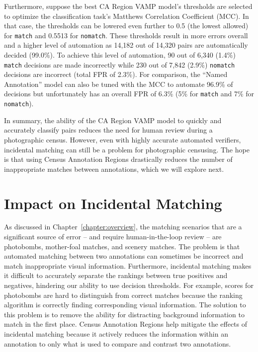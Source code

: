 Furthermore, suppose the best CA Region VAMP model's thresholds are selected to optimize the classification task's Matthews Correlation Coefficient (MCC). In that case, the thresholds can be lowered even further to 0.5 (the lowest allowed) for \texttt{match} and 0.5513 for \texttt{nomatch}.  These thresholds result in more errors overall and a higher level of automation as 14,182 out of 14,320 pairs are automatically decided (99.0\%).  To achieve this level of automation, 90 out of 6,340 (1.4\%) \texttt{match} decisions are made incorrectly while 230 out of 7,842 (2.9\%) \texttt{nomatch} decisions are incorrect (total FPR of 2.3\%).  For comparison, the ``Named Annotation'' model can also be tuned with the MCC to automate 96.9\% of decisions but unfortunately has an overall FPR of 6.3\% (5\% for \texttt{match} and 7\% for \texttt{nomatch}).

In summary, the ability of the CA Region VAMP model to quickly and accurately classify pairs reduces the need for human review during a photographic census.  However, even with highly accurate automated verifiers, incidental matching can still be a problem for photographic censusing.  The hope is that using Census Annotation Regions drastically reduces the number of inappropriate matches between annotations, which we will explore next.

\section{Impact on Incidental Matching}

As discussed in Chapter~\ref{chapter:overview}, the matching scenarios that are a significant source of error -- and require human-in-the-loop review -- are photobombs, mother-foal matches, and scenery matches.  The problem is that automated matching between two annotations can sometimes be incorrect and match inappropriate visual information.  Furthermore, incidental matching makes it difficult to accurately separate the rankings between true positives and negatives, hindering our ability to use decision thresholds.  For example, scores for photobombs are hard to distinguish from correct matches because the ranking algorithm is correctly finding corresponding visual information.  The solution to this problem is to remove the ability for distracting background information to match in the first place.  Census Annotation Regions help mitigate the effects of incidental matching because it actively reduces the information within an annotation to only what is used to compare and contrast two annotations.

